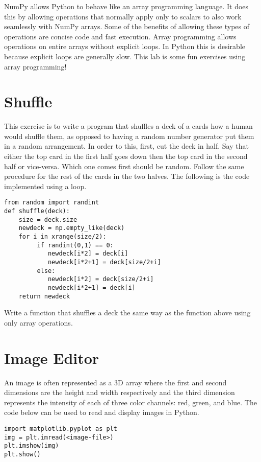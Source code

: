 \label{lab:Python_Vectorization}

NumPy allows Python to behave like an array programming language.
It does this by allowing operations that normally apply only to scalars to also work seamlessly with NumPy arrays.
Some of the benefits of allowing these types of operations are concise code and fast execution.
Array programming allows operations on entire arrays without explicit  loops.
In Python this is desirable because explicit  loops are generally slow.
This lab is some fun exercises using array programming!

\section*{Shuffle}
This exercise is to write a program that shuffles a deck of a cards how a human would shuffle them, as opposed to having a random number generator put them in a random arrangement. 
In order to this, first, cut the deck in half. 
Say that either the top card in the first half goes down then the top card in the second half or vice-versa.
Which one comes first should be random.
Follow the same procedure for the rest of the cards in the two halves. 
The following is the code implemented using a loop.
\begin{lstlisting}
from random import randint
def shuffle(deck):
    size = deck.size
    newdeck = np.empty_like(deck)
    for i in xrange(size/2):
         if randint(0,1) == 0:
            newdeck[i*2] = deck[i]
            newdeck[i*2+1] = deck[size/2+i]
         else:
            newdeck[i*2] = deck[size/2+i]
            newdeck[i*2+1] = deck[i]
    return newdeck
\end{lstlisting}

\begin{problem}
Write a function that shuffles a deck the same way as the function above using only array operations.
\end{problem}

\section*{Image Editor}
An image is often represented as a 3D array where the first and second dimensions are the height and width respectively and the third dimension represents the intensity of each of three color channels: red, green, and blue.
The code below can be used to read and display images in Python.
\begin{lstlisting}
import matplotlib.pyplot as plt
img = plt.imread(<image-file>)
plt.imshow(img)
plt.show()
\end{lstlisting}

